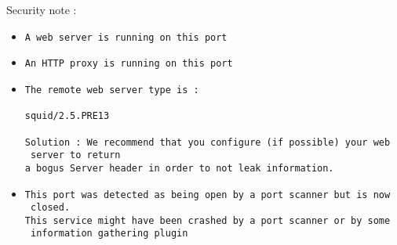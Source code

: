 \documentclass{article}
\begin{document}
Security note :\\
\begin{itemize}
\item \begin{verbatim}
A web server is running on this port
\end{verbatim}\item \begin{verbatim}
An HTTP proxy is running on this port
\end{verbatim}\item \begin{verbatim}
The remote web server type is :

squid/2.5.PRE13

Solution : We recommend that you configure (if possible) your web
 server to return
a bogus Server header in order to not leak information.

\end{verbatim}\item \begin{verbatim}
This port was detected as being open by a port scanner but is now
 closed.
This service might have been crashed by a port scanner or by some
 information gathering plugin


\end{verbatim}\end{itemize}
\end{document}
